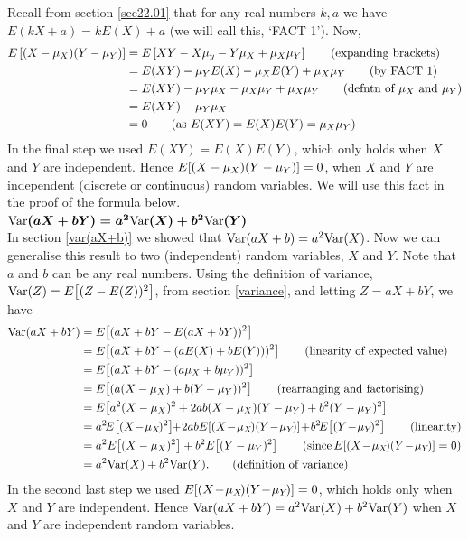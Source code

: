 \noindent Recall from section \ref{sec22.01} that for any real numbers $k,a$ we have $E(kX + a) = kE(X) + a$ (we will call this, `FACT 1'). Now,
\begin{align*}
E\left[(X - \mu_X)(Y - \mu_Y)\right] & = E\left[XY - X\mu_y - Y\mu_X + \mu_X\mu_Y\right] \tag{expanding brackets} \\
	& = E(XY) - \mu_YE(X) - \mu_XE(Y) + \mu_X\mu_Y \tag{by FACT 1} \\
	& = E(XY) - \mu_Y\mu_X - \mu_X\mu_Y + \mu_X\mu_Y \tag{defntn of $\mu_X$ and $\mu_Y$} \\
	& = E(XY) - \mu_Y\mu_X \\
	& = 0 \tag{as $E(XY) = E(X)E(Y) = \mu_X\mu_Y$}
\end{align*}
In the final step we used $E(XY) = E(X)E(Y)$, which only holds when $X$ and $Y$ are independent. Hence $E\!\left[(X - \mu_X)(Y - \mu_Y)\right] = 0$, when $X$ and $Y$ are independent (discrete or continuous) random variables. We will use this fact in the proof of the formula below. \\

\noindent \textbf{$\boldsymbol{\text{Var}(aX + bY) = a^2\text{Var}(X) + b^2\text{Var}(Y)}$} \\
In section \ref{var(aX+b)} we showed that $\text{Var}(aX+b) = a^2\text{Var}(X)$. Now we can generalise this result to two (independent) random variables, $X$ and $Y$. Note that $a$ and $b$ can be any real numbers. Using the definition of variance, $\text{Var}(Z) = E\!\left[(Z - E(Z))^2\right]$, from section \ref{variance}, and letting $Z = aX + bY$, we have
\begin{align*}
\Var(aX+bY) & = E\!\squac{(aX+bY - E(aX+bY))^2} \\
	& =  E\!\squac{(aX+bY - (aE(X)+bE(Y)))^2} \tag{linearity of expected value} \\
	& = E\!\squac{(aX+bY - (a\mu_X+b\mu_Y))^2} \\
	& = E\!\squac{(a(X - \mu_X) + b(Y - \mu_Y))^2} \tag{rearranging and factorising} \\
	& = E\!\squac{a^2(X - \mu_X)^2 + 2ab(X - \mu_X)(Y-\mu_Y) + b^2(Y - \mu_Y)^2} \\
	& = a^2\!E\!\squac{(X\! -\! \mu_X\!)^2}\!\! +\! 2abE\!\squac{(X\! -\! \mu_X\!)(Y\! - \!\mu_Y\!)} \!+\! b^2\!E\!\squac{(Y \!-\! \mu_Y\!)^2} \tag{linearity} \\
	& = a^2E\!\squac{(X - \mu_X)^2} + b^2E\!\squac{(Y - \mu_Y)^2} \tag{since \!\!\! $E\!\squac{(X\! -\! \mu_X\!)(Y\! - \!\mu_Y\!)} = 0$} \\
	& = a^2\Var(X) + b^2\Var(Y). \tag{definition of variance}
\end{align*}
In the second last step we used $E\!\left[(X\! -\! \mu_X\!)(Y\! - \!\mu_Y\!)\right] = 0$, which holds only when $X$ and $Y$ are independent. Hence $\text{Var}(aX+bY) = a^2\text{Var}(X) + b^2\text{Var}(Y)$ when $X$ and $Y$ are independent random variables. \\

